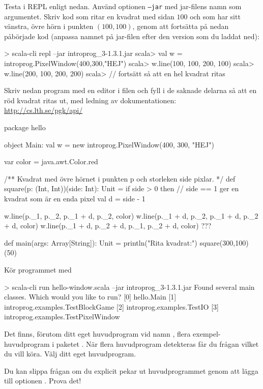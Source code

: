 \Subtask Testa  i REPL enligt nedan. Använd optionen \texttt{--jar} med jar-filens namn som argumentet. Skriv kod som ritar en kvadrat med sidan $100$ och som har sitt vänstra, övre hörn i punkten $(100,100)$, genom att fortsätta på nedan påbörjade kod (anpassa namnet på jar-filen efter den version som du laddat ned): 

\begin{REPL}
> scala-cli repl --jar introprog_3-1.3.1.jar
scala> val w = introprog.PixelWindow(400,300,"HEJ")
scala> w.line(100, 100, 200, 100)
scala> w.line(200, 100, 200, 200)
scala> // fortsätt så att en hel kvadrat ritas
\end{REPL}

\Subtask Skriv nedan program med en editor i filen  och fyll i de saknade delarna så att en röd kvadrat ritas ut, med ledning av dokumentationen:\\\url{http://cs.lth.se/pgk/api/}

\begin{Code}
package hello

object Main:
  val w = new introprog.PixelWindow(400, 300, "HEJ")

  var color = java.awt.Color.red

  /** Kvadrat med övre hörnet i punkten p och storleken side pixlar. */
  def square(p: (Int, Int))(side: Int): Unit =
    if side > 0 then
      // side == 1 ger en kvadrat som är en enda pixel
      val d = side - 1  

      w.line(p._1,     p._2,     p._1 + d, p._2,     color)
      w.line(p._1 + d, p._2,     p._1 + d, p._2 + d, color)
      w.line(p._1 + d, p._2 + d, p._1,     p._2 + d, color)
      ???

  def main(args: Array[String]): Unit =
    println("Rita kvadrat:")
    square(300,100)(50)
\end{Code}
Kör programmet med
\begin{REPLnonum}
> scala-cli run hello-window.scala --jar introprog_3-1.3.1.jar
Found several main classes. Which would you like to run?
[0] hello.Main
[1] introprog.examples.TestBlockGame
[2] introprog.examples.TestIO
[3] introprog.examples.TestPixelWindow
\end{REPLnonum}
Det finns, förutom  ditt eget huvudprogram vid namn , flera exempel-huvudprogram i paketet . När flera huvudprogram detekteras får du frågan vilket du vill köra. Välj ditt eget huvudprogram.

\Subtask Du kan slippa frågan om du explicit pekar ut huvudprogrammet genom att lägga till optionen . Prova det!

